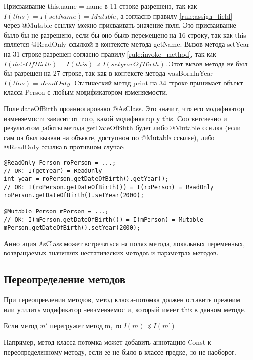 Присваивание this.name = name в 11 строке разрешено, так как $I(this) = I(setName) = Mutable$, а согласно правилу \ref{rule:assign_field} через @Mutable ссылку можно присваивать значение поля. Это присваивание было бы не разрешено, если бы оно было перемещено  на 16 строку, так как this является @ReadOnly ссылкой в контексте метода getName. Вызов метода setYear на 31 строке разрешен согласно правилу \ref{rule:invoke_method}, так как $I(dateOfBirth) = I(this) \preceq I(setyearOfBirth)$. Этот вызов метода не был бы разрешен на 27 строке, так как в контексте метода wasBornInYear $I(this) = ReadOnly$. Статический метод print на 34 строке принимает объект класса Person с любым модификатором изменяемости. 

Поле dateOfBirth проаннотировано @AsClass. Это значит, что его модификатор изменяемости зависит от того, какой модификатор у this. Соответсвенно и результатом работы метода getDateOfBirth будет либо @Mutable ссылка (если сам он был вызван на объекте, доступном по @Mutable ссылке), либо @ReadOnly ссылка в противном случае:

\begin{lstlisting}[caption=Использование аннотации AsClass, label=code:as_class]
@ReadOnly Person roPerson = ...;
// OK: I(getYear) = ReadOnly
int year = roPerson.getDateOfBirth().getYear(); 
// OK: I(roPerson.getDateOfBirth()) = I(roPerson) = ReadOnly
roPerson.getDateOfBirth().setYear(2000); 
	
@Mutable Person mPerson = ...;
// OK: I(mPerson.getDateOfBirth()) = I(mPerson) = Mutable
mPerson.getDateOfBirth().setYear(2000); 
\end{lstlisting} 

Аннотация AsClass может встречаться на полях метода, локальных переменных, возвращаемых значениях нестатических методов и параметрах методов.

\subsection{Переопределение методов}

При переопреелении методов, метод класса-потомка должен оставить прежним или усилить модификатор неизменяемости, который имеет this в данном методе. 

\begin{Rule}\label{rule:override_method}
Если метод $m'$ перегружет метод m, то $I(m) \preceq I(m')$
\end{Rule}

Например, метод класса-потомка может добавить аннотацию Const к переопределенному методу, если ее не было в классе-предке, но не наоборот. 

